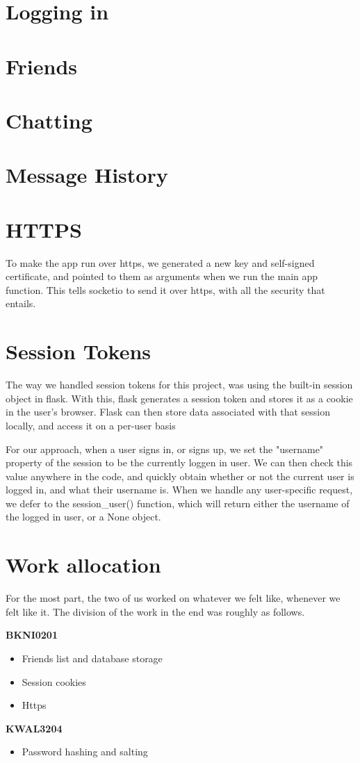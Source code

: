 \documentclass[12pt]{article}
\begin{document}

\section{Logging in}
\section{Friends}
\section{Chatting}
\section{Message History}
\section{HTTPS}

To make the app run over https, we generated a new key and self-signed certificate, and pointed to them as arguments when we run the main app function. This tells socketio to send it over https, with all the security that entails.

\section{Session Tokens}

The way we handled session tokens for this project, was using the built-in session object in flask. With this, flask generates a session token and stores it as a cookie in the user's browser. Flask can then store data associated with that session locally, and access it on a per-user basis

For our approach, when a user signs in, or signs up, we set the "username" property of the session to be the currently loggen in user. We can then check this value anywhere in the code, and quickly obtain whether or not the current user is logged in, and what their username is. When we handle any user-specific request, we defer to the session\_user() function, which will return either the username of the logged in user, or a None object.

\section{Work allocation}

For the most part, the two of us worked on whatever we felt like, whenever we felt like it. The division of the work in the end was roughly as follows.
\newline

\noindent \textbf{BKNI0201}

\begin{itemize}
\item Friends list and database storage
\item Session cookies
\item Https
\end{itemize}

\noindent \textbf{KWAL3204}

\begin{itemize}
\item Password hashing and salting
\end{itemize}
\end{document}
